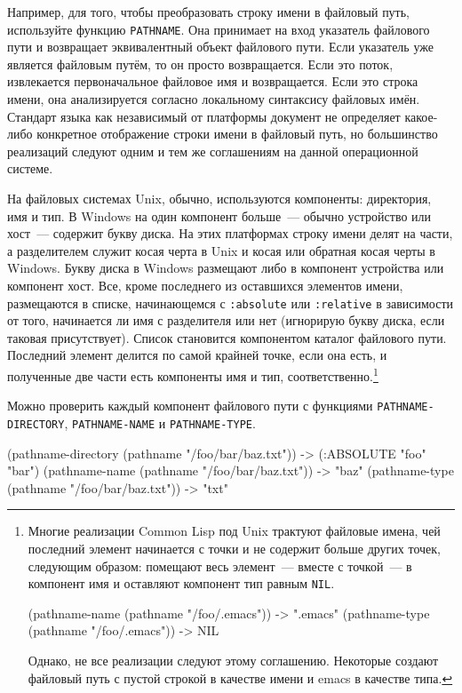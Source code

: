 Например, для того, чтобы преобразовать строку имени в файловый путь, используйте функцию
\lstinline{PATHNAME}. Она принимает на вход указатель файлового пути и возвращает эквивалентный
объект файлового пути. Если указатель уже является файловым путём, то он просто
возвращается. Если это поток, извлекается первоначальное файловое имя и возвращается. Если
это строка имени, она анализируется согласно локальному синтаксису файловых имён. Стандарт
языка как независимый от платформы документ не определяет какое-либо конкретное
отображение строки имени в файловый путь, но большинство реализаций следуют одним и тем же
соглашениям на данной операционной системе.

На файловых системах Unix, обычно, используются компоненты: директория, имя и тип. В
Windows на один компонент больше~--- обычно устройство или хост~--- содержит букву диска. На
этих платформах строку имени делят на части, а разделителем служит косая черта в Unix и
косая или обратная косая черты в Windows. Букву диска в Windows размещают либо в компонент
устройства или компонент хост. Все, кроме последнего из оставшихся элементов имени,
размещаются в списке, начинающемся с \lstinline{:absolute} или \lstinline{:relative} в зависимости
от того, начинается ли имя с разделителя или нет (игнорирую букву диска, если таковая
присутствует). Список становится компонентом каталог файлового пути. Последний элемент
делится по самой крайней точке, если она есть, и полученные две части есть компоненты имя
и тип, соответственно.\footnote{Многие реализации Common Lisp под Unix трактуют файловые
  имена, чей последний элемент начинается с точки и не содержит больше других точек,
  следующим образом: помещают весь элемент~--- вместе с точкой~--- в компонент имя и
  оставляют компонент тип равным \lstinline{NIL}.

\begin{myverb}
(pathname-name (pathname "/foo/.emacs")) -> ".emacs" 
(pathname-type (pathname "/foo/.emacs")) -> NIL 
\end{myverb}

Однако, не все реализации следуют этому соглашению. Некоторые создают файловый путь с
пустой строкой в качестве имени и emacs в качестве типа.}

Можно проверить каждый компонент файлового пути с функциями \lstinline{PATHNAME-DIRECTORY},
\lstinline{PATHNAME-NAME} и \lstinline{PATHNAME-TYPE}.

\begin{myverb}
(pathname-directory (pathname "/foo/bar/baz.txt")) -> (:ABSOLUTE "foo" "bar") 
(pathname-name (pathname "/foo/bar/baz.txt"))      -> "baz" 
(pathname-type (pathname "/foo/bar/baz.txt"))      -> "txt" 
\end{myverb}

